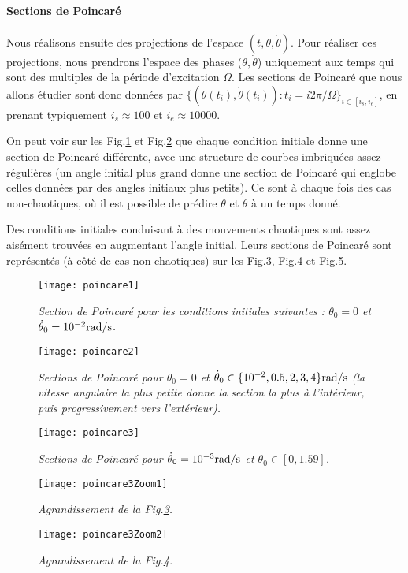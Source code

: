 \documentclass[a4paper,12pt,oneside]{article}
\def \t {\theta}
\def \vt {\Dot{\theta}}
\begin{document}
\paragraph{Sections de Poincaré}
Nous réalisons ensuite des projections de l'espace $(t,\t,\vt)$. Pour réaliser ces projections, nous prendrons l'espace des phases ($\t,\vt$) uniquement aux temps qui sont des multiples de la période d'excitation $\Omega$. Les sections de Poincaré que nous allons étudier sont donc données par $\{(\t(t_i),\vt(t_i)) : t_i=i2\pi/\Omega \}_{i \in [i_s,i_e]}$, en prenant typiquement $i_s\approx 100$ et $i_e \approx 10000$. 

On peut voir sur les Fig.\ref{poincare1} et Fig.\ref{poincare2} que chaque condition initiale donne une section de Poincaré différente, avec une structure de courbes imbriquées assez régulières (un angle initial plus grand donne une section de Poincaré qui englobe celles données par des angles initiaux plus petits). Ce sont à chaque fois des cas non-chaotiques, où il est possible de prédire $\t$ et $\vt$ à un temps donné. 

Des conditions initiales conduisant à des mouvements chaotiques sont assez aisément trouvées en augmentant l'angle initial. Leurs sections de Poincaré sont représentés (à côté de cas non-chaotiques) sur les Fig.\ref{poincare3}, Fig.\ref{poincare3Zoom1} et Fig.\ref{poincare3Zoom2}.


\begin{figure}[H]
    \centerline{\texttt{[image: poincare1]}}
\caption{ \label{poincare1}\em
Section de Poincaré pour les conditions initiales suivantes : $\t_0=0$ et $\vt_0=10^{-2}\rm{rad/s}$.
}
\end{figure}

\begin{figure}[H]
    \centerline{\texttt{[image: poincare2]}}
\caption{ \label{poincare2}\em
Sections de Poincaré pour $\t_0=0$ et $\vt_0 \in \{10^{-2}, 0.5, 2, 3, 4\}\rm{rad/s}$ (la vitesse angulaire la plus petite donne la section la plus à l'intérieur, puis progressivement vers l'extérieur).
}
\end{figure}
\begin{figure}[H]
    \centerline{\texttt{[image: poincare3]}}
\caption{ \label{poincare3}\em
Sections de Poincaré pour $\vt_0=10^{-3}\rm{rad/s}$ et $\t_0 \in [0,1.59]$.
}
\end{figure}
\begin{figure}[H]
    \centerline{\texttt{[image: poincare3Zoom1]}}
\caption{ \label{poincare3Zoom1}\em
Agrandissement de la Fig.\ref{poincare3}.
}
\end{figure}
\begin{figure}[H]
    \centerline{\texttt{[image: poincare3Zoom2]}}
\caption{ \label{poincare3Zoom2}\em
Agrandissement de la Fig.\ref{poincare3Zoom1}.
}
\end{figure}
\end{document}
